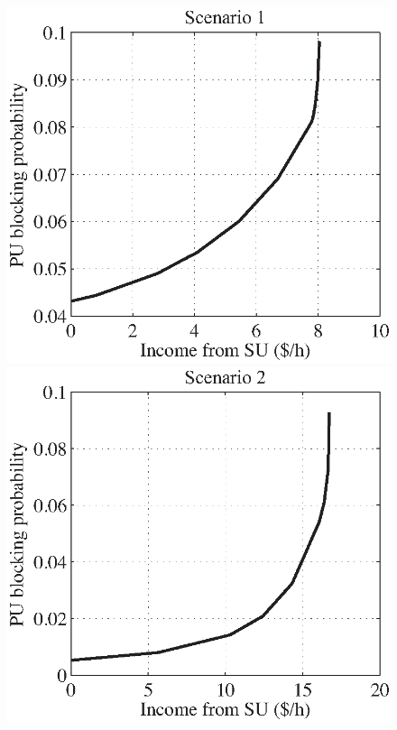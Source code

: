 \begin{figure}
\centering
\includegraphics[scale=0.5]{MDPauction3010.eps}
\includegraphics[scale=0.5]{MDPauction2020.eps} \\

\end{figure}
